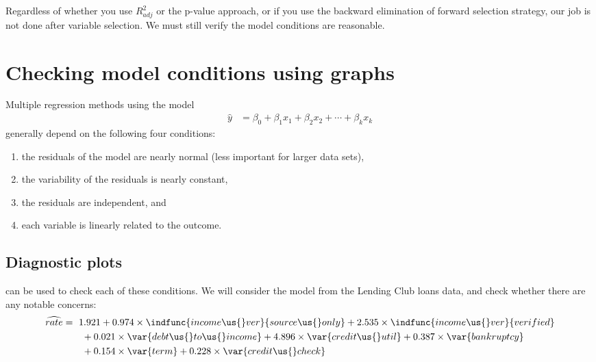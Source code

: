 Regardless of whether you use $R_{adj}^2$ or the p-value approach,
or if you use the backward elimination of forward selection
strategy, our job is not done after variable selection.
We must still verify the model conditions are reasonable.



{}







\section{Checking model conditions using graphs}
\label{multipleRegressionModelAssumptions}


\noindent%
Multiple regression methods using the model
\begin{align*}
\hat{y} &= \beta_0 + \beta_1x_1 + \beta_2x_2 + \cdots + \beta_kx_k
\end{align*}
generally depend on the following four conditions:
\begin{enumerate}
\setlength{\itemsep}{0mm}
\item the residuals of the model are nearly normal
    (less important for larger data sets),
\item the variability of the residuals is nearly constant,
\item the residuals are independent, and
\item each variable is linearly related to the outcome.
\end{enumerate}


\subsection{Diagnostic plots}
\label{diagnostic_plots_subsection}

 can be used
to check each of these conditions.
We will consider the
model from the Lending Club loans data, and check whether
there are any notable concerns:
\begin{align*}
\widehat{rate} &= \ 1.921
    + 0.974 \times \indfunc{income\us{}ver}{source\us{}only}
    + 2.535 \times \indfunc{income\us{}ver}{verified} \\
  &\qquad
    + 0.021 \times \var{debt\us{}to\us{}income}
    + 4.896 \times \var{credit\us{}util}
    + 0.387 \times \var{bankruptcy} \\
  &\qquad
    + 0.154 \times \var{term}
    + 0.228 \times \var{credit\us{}check}
\end{align*}

